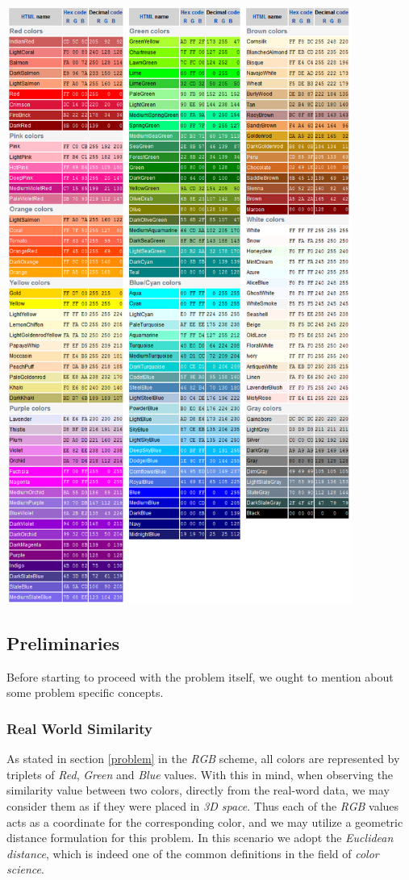 \documentclass[egilmezThesis.tex]{subfiles}
\begin{document}
\begin{center}
\includegraphics[width=0.85\textwidth]{misc/colorTable.png}
\end{center}

\subsection{Preliminaries}
\label{prem}
Before starting to proceed with the problem itself, we ought to mention about some problem specific concepts.

\subsubsection{Real World Similarity}
\label{rws}
As stated in section \ref{problem} in the \textit{RGB} scheme, all colors are represented by triplets of  \textit{Red}, \textit{Green} and \textit{Blue} values. With this in mind, when observing the similarity value between two colors, directly from the real-word data, we may consider them as if they were placed in \textit{3D space}. Thus each of the \textit{RGB} values acts as a coordinate for the corresponding color, and we may utilize a geometric distance formulation for this problem. In this scenario we adopt the \textit{Euclidean distance}, which is indeed one of the common definitions in the field of \textit{color science}. \cite{Sha02}
\end{document}
